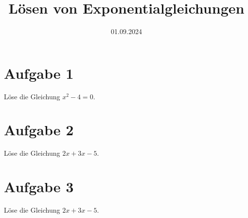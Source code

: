 \documentclass{worksheet}
\date{01.09.2024}
\title{Lösen von Exponentialgleichungen}
\begin{document}
\section*{Aufgabe 1}
Löse die Gleichung \(x^2 - 4 = 0\).


\section*{Aufgabe 2}
Löse die Gleichung \(2x + 3x - 5\).

\section*{Aufgabe 3}

Löse die Gleichung \(2x + 3x - 5\).
\thinkbubble[Test]

\thinkbubble[\phantom{answer}]

\end{document}
